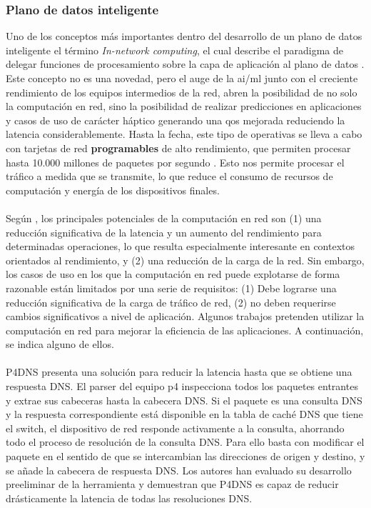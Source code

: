 \subsubsection{Plano de datos inteligente}

Uno de los conceptos más importantes dentro del desarrollo de un plano de datos inteligente el término \textit{In-network computing}, el cual describe el paradigma de delegar funciones de procesamiento sobre la capa de aplicación al plano de datos \cite{hu2021energy}. Este concepto no es una novedad, pero el auge de la \gls{ai}/\gls{ml} junto con el creciente rendimiento de los equipos intermedios de la red, abren la posibilidad de no solo la computación en red, sino la posibilidad de realizar predicciones en aplicaciones y casos de uso de carácter háptico generando una \gls{qos} mejorada reduciendo la latencia considerablemente. Hasta la fecha, este tipo de operativas se lleva a cabo con tarjetas de red \textbf{programables} de alto rendimiento, que permiten procesar hasta 10.000 millones de paquetes por segundo \cite{hu2021energy}. Esto nos permite procesar el tráfico a medida que se transmite, lo que reduce el consumo de recursos de computación y energía de los dispositivos finales.\\
\\
Según \cite{sapio2017network}, los principales potenciales de la computación en red son (1) una reducción significativa de la latencia y un aumento del rendimiento para determinadas operaciones, lo que resulta especialmente interesante en contextos orientados al rendimiento, y (2) una reducción de la carga de la red. Sin embargo, los casos de uso en los que la computación en red puede explotarse de forma razonable están limitados por una serie de requisitos: (1) Debe lograrse una reducción significativa de la carga de tráfico de red, (2) no deben requerirse cambios significativos a nivel de aplicación. Algunos trabajos pretenden utilizar la computación en red para mejorar la eficiencia de las aplicaciones. A continuación, se indica alguno de ellos.\\
\\
P4DNS \cite{woodruff2019p4dns} presenta una solución para reducir la latencia hasta que se obtiene una respuesta DNS. El parser del equipo \gls{p4} inspecciona todos los paquetes entrantes y extrae sus cabeceras hasta la cabecera DNS. Si el paquete es una consulta DNS y la respuesta correspondiente está disponible en la tabla de caché DNS que tiene el switch, el dispositivo de red responde activamente a la consulta, ahorrando todo el proceso de resolución de la consulta DNS. Para ello basta con modificar el paquete en el sentido de que se intercambian las direcciones de origen y destino, y se añade la cabecera de respuesta DNS. Los autores han evaluado su desarrollo preeliminar de la herramienta y demuestran que P4DNS es capaz de reducir drásticamente la latencia de todas las resoluciones DNS.\\


